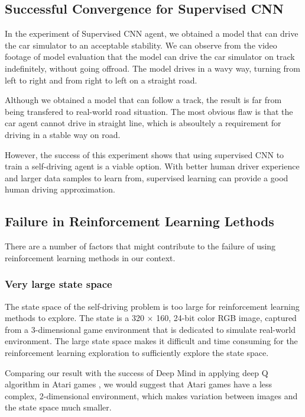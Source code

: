 \documentclass[a4paper]{article}
\begin{document}
\subsection{Successful Convergence for Supervised CNN}

In the experiment of Supervised CNN agent, we obtained a model that can drive the car simulator to an acceptable stability. We can observe from the video footage of model evaluation that the model can drive the car simulator on track indefinitely, without going offroad. The model drives in a wavy way, turning from left to right and from right to left on a straight road.

Although we obtained a model that can follow a track, the result is far from being transfered to real-world road situation. The most obvious flaw is that the car agent cannot drive in straight line, which is absoultely a requirement for driving in a stable way on road.

However, the success of this experiment shows that using supervised CNN to train a self-driving agent is a viable option. With better human driver experience and larger data samples to learn from, supervised learning can provide a good human driving approximation.

\subsection{Failure in Reinforcement Learning Lethods}

There are a number of factors that might contribute to the failure of using reinforcement learning methods in our context.

\subsubsection{Very large state space}

The state space of the self-driving problem is too large for reinforcement learning methods to explore. The state is a 320 $\times$ 160, 24-bit color RGB image, captured from a 3-dimensional game environment that is dedicated to simulate real-world environment. The large state space makes it difficult and time consuming for the reinforcement learning exploration to sufficiently explore the state space. 

Comparing our result with the success of Deep Mind in applying deep Q algorithm in Atari games \cite{mnih2013playing}, we would suggest that Atari games have a less complex, 2-dimensional environment, which makes variation between images and the state space much smaller.
\end{document}

